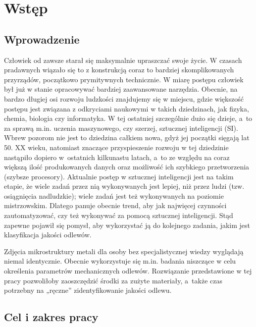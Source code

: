 \chapter{Wstęp}
\label{cha:wstep}

\section{Wprowadzenie}
\label{sec:wprowadzenie}

Człowiek od zawsze starał się maksymalnie upraszczać swoje życie. W czasach pradawnych wiązało się to z konstrukcją coraz to bardziej skomplikowanych przyrządów, początkowo prymitywnych technicznie. W miarę postępu człowiek był już w stanie opracowywać bardziej zaawansowane narzędzia. Obecnie, na bardzo długiej osi rozwoju ludzkości znajdujemy się w miejscu, gdzie większość postępu jest związana z odkryciami naukowymi w takich dziedzinach, jak fizyka, chemia, biologia czy informatyka. W tej ostatniej szczególnie dużo się dzieje, a~to za sprawą m.in. uczenia maszynowego, czy szerzej, sztucznej inteligencji (SI). Wbrew pozorom nie jest to dziedzina całkiem nowa, gdyż jej początki sięgają lat 50. XX wieku, natomiast znaczące przyspieszenie rozwoju w tej dziedzinie nastąpiło dopiero w~ostatnich kilkunastu latach, a~to ze względu na coraz większą ilość produkowanych danych oraz możliwość ich szybkiego przetworzenia (szybsze procesory). Aktualnie postęp w sztucznej inteligencji jest na takim etapie, że wiele zadań przez nią wykonywanych jest lepiej, niż przez ludzi (tzw. osiągnięcia nadludzkie); wiele zadań jest też wykonywanych na poziomie mistrzowskim. Dlatego panuje obecnie trend, aby jak najwięcej czynności zautomatyzować, czy też wykonywać za pomocą sztucznej inteligencji. Stąd zapewne pojawił się pomysł, aby wykorzystać ją do kolejnego zadania, jakim jest klasyfikacja jakości odlewów.

Zdjęcia mikrostruktury metali dla osoby bez specjalistycznej wiedzy wyglądają niemal identycznie. Obecnie wykorzystuje się m.in. badania niszczące w celu określenia parametrów mechanicznych odlewów. Rozwiązanie przedstawione w tej pracy pozwoliłoby zaoszczędzić środki za zużyte materiały, a~także czas potrzebny na „ręczne” zidentyfikowanie jakości odlewu.

\section{Cel i zakres pracy}
\label{sec:cel}

